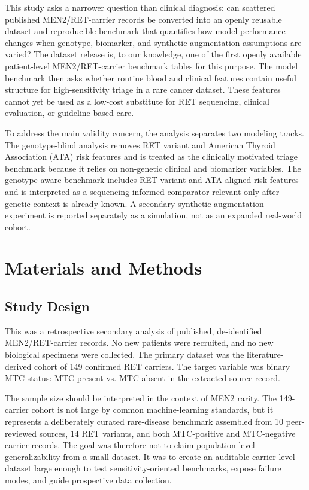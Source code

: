 \documentclass[12pt]{article}
\begin{document}
This study asks a narrower question than clinical diagnosis: can scattered published MEN2/RET-carrier records be converted into an openly reusable dataset and reproducible benchmark that quantifies how model performance changes when genotype, biomarker, and synthetic-augmentation assumptions are varied? The dataset release is, to our knowledge, one of the first openly available patient-level MEN2/RET-carrier benchmark tables for this purpose. The model benchmark then asks whether routine blood and clinical features contain useful structure for high-sensitivity triage in a rare cancer dataset. These features cannot yet be used as a low-cost substitute for RET sequencing, clinical evaluation, or guideline-based care.

To address the main validity concern, the analysis separates two modeling tracks. The genotype-blind analysis removes RET variant and American Thyroid Association (ATA) risk features and is treated as the clinically motivated triage benchmark because it relies on non-genetic clinical and biomarker variables. The genotype-aware benchmark includes RET variant and ATA-aligned risk features and is interpreted as a sequencing-informed comparator relevant only after genetic context is already known. A secondary synthetic-augmentation experiment is reported separately as a simulation, not as an expanded real-world cohort.

\section{Materials and Methods}

\subsection{Study Design}
This was a retrospective secondary analysis of published, de-identified MEN2/RET-carrier records. No new patients were recruited, and no new biological specimens were collected. The primary dataset was the literature-derived cohort of 149 confirmed RET carriers. The target variable was binary MTC status: MTC present vs. MTC absent in the extracted source record.

The sample size should be interpreted in the context of MEN2 rarity. The 149-carrier cohort is not large by common machine-learning standards, but it represents a deliberately curated rare-disease benchmark assembled from 10 peer-reviewed sources, 14 RET variants, and both MTC-positive and MTC-negative carrier records. The goal was therefore not to claim population-level generalizability from a small dataset. It was to create an auditable carrier-level dataset large enough to test sensitivity-oriented benchmarks, expose failure modes, and guide prospective data collection.
\end{document}
